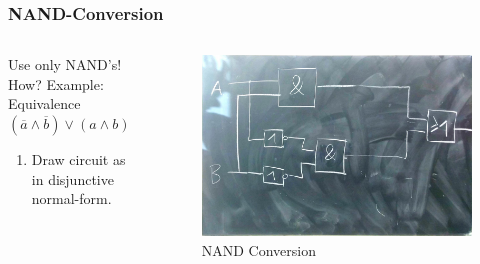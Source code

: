 \documentclass{beamer}
\begin{document}
\begin{frame}  \frametitle{NAND-Conversion}
  \begin{columns}
  \begin{column}{5cm}
  Use only NAND's! How?
  \newline
    \newline Example: Equivalence
  \newline
  $(\overline{a}\land \overline{b})\lor(a\land b)$
  \newline
  \begin{enumerate}
   \item Draw circuit as in disjunctive normal-form.
  \end{enumerate}

  \end{column}
  
  \begin{column}{6cm}
    \begin{figure}[H]
      \centering
      \includegraphics[width=1\textwidth]{eq1}%
      \caption{NAND Conversion}%
      \label{fig:eq1}
    \end{figure}
  \end{column}
  \end{columns}  
\end{frame}
\end{document}
